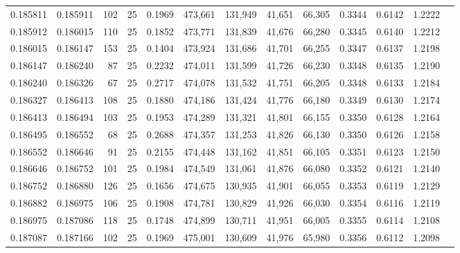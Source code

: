 \begin{tabular}{rrrrrrrrrrrrr}
0.185811 & 0.185911 &   102 &  25 &                                     0.1969 & 473,661 & 131,949 &  41,651 &  66,305 & 0.3344 & 0.6142 & 1.2222 \\
0.185912 & 0.186015 &   110 &  25 &                                     0.1852 & 473,771 & 131,839 &  41,676 &  66,280 & 0.3345 & 0.6140 & 1.2212 \\
0.186015 & 0.186147 &   153 &  25 &                                     0.1404 & 473,924 & 131,686 &  41,701 &  66,255 & 0.3347 & 0.6137 & 1.2198 \\
0.186147 & 0.186240 &    87 &  25 &                                     0.2232 & 474,011 & 131,599 &  41,726 &  66,230 & 0.3348 & 0.6135 & 1.2190 \\
0.186240 & 0.186326 &    67 &  25 &                                     0.2717 & 474,078 & 131,532 &  41,751 &  66,205 & 0.3348 & 0.6133 & 1.2184 \\
0.186327 & 0.186413 &   108 &  25 &                                     0.1880 & 474,186 & 131,424 &  41,776 &  66,180 & 0.3349 & 0.6130 & 1.2174 \\
0.186413 & 0.186494 &   103 &  25 &                                     0.1953 & 474,289 & 131,321 &  41,801 &  66,155 & 0.3350 & 0.6128 & 1.2164 \\
0.186495 & 0.186552 &    68 &  25 &                                     0.2688 & 474,357 & 131,253 &  41,826 &  66,130 & 0.3350 & 0.6126 & 1.2158 \\
0.186552 & 0.186646 &    91 &  25 &                                     0.2155 & 474,448 & 131,162 &  41,851 &  66,105 & 0.3351 & 0.6123 & 1.2150 \\
0.186646 & 0.186752 &   101 &  25 &                                     0.1984 & 474,549 & 131,061 &  41,876 &  66,080 & 0.3352 & 0.6121 & 1.2140 \\
0.186752 & 0.186880 &   126 &  25 &                                     0.1656 & 474,675 & 130,935 &  41,901 &  66,055 & 0.3353 & 0.6119 & 1.2129 \\
0.186882 & 0.186975 &   106 &  25 &                                     0.1908 & 474,781 & 130,829 &  41,926 &  66,030 & 0.3354 & 0.6116 & 1.2119 \\
0.186975 & 0.187086 &   118 &  25 &                                     0.1748 & 474,899 & 130,711 &  41,951 &  66,005 & 0.3355 & 0.6114 & 1.2108 \\
0.187087 & 0.187166 &   102 &  25 &                                     0.1969 & 475,001 & 130,609 &  41,976 &  65,980 & 0.3356 & 0.6112 & 1.2098 \\

\end{tabular}
